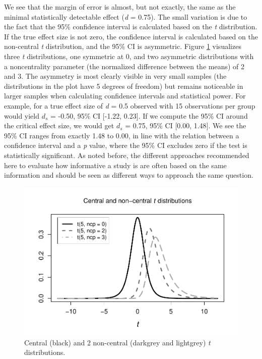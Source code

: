 \documentclass[
  english,
  ,jou, a4paper,floatsintext]{apa6}
\begin{document}
We see that the margin of error is almost, but not exactly, the same as the minimal statistically detectable effect (\emph{d} = 0.75). The small variation is due to the fact that the 95\% confidence interval is calculated based on the \emph{t} distribution. If the true effect size is not zero, the confidence interval is calculated based on the non-central \emph{t} distribution, and the 95\% CI is asymmetric. Figure \ref{fig:noncentralt} visualizes three \emph{t} distributions, one symmetric at 0, and two asymmetric distributions with a noncentrality parameter (the normalized difference between the means) of 2 and 3. The asymmetry is most clearly visible in very small samples (the distributions in the plot have 5 degrees of freedom) but remains noticeable in larger samples when calculating confidence intervals and statistical power. For example, for a true effect size of \emph{d} = 0.5 observed with 15 observations per group would yield \(d_s\) = -0.50, 95\% CI {[}-1.22, 0.23{]}. If we compute the 95\% CI around the critical effect size, we would get \(d_s\) = 0.75, 95\% CI {[}0.00, 1.48{]}. We see the 95\% CI ranges from exactly 1.48 to 0.00, in line with the relation between a confidence interval and a \emph{p} value, where the 95\% CI excludes zero if the test is statistically significant. As noted before, the different approaches recommended here to evaluate how informative a study is are often based on the same information and should be seen as different ways to approach the same question.

\begin{figure}
\centering
\includegraphics{sample_size_justification_files/figure-latex/noncentralt-1.pdf}
\caption{\label{fig:noncentralt}Central (black) and 2 non-central (darkgrey and lightgrey) \emph{t} distributions.}
\end{figure}
\end{document}
